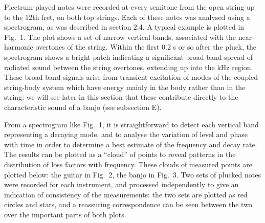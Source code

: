   Plectrum-played notes were recorded at every semitone from the open string up 
  to the 12th fret, on both top strings. Each of these notes was analysed using 
  a spectrogram, as was described in section 2.4. A typical example is plotted 
  in Fig.\ 1. The plot shows a set of narrow vertical bands, associated with 
  the near-harmonic overtones of the string. Within the first 0.2 s or so after 
  the pluck, the spectrogram shows a bright patch indicating a significant 
  broad-band spread of radiated sound between the string overtones, extending 
  up into the kHz region. These broad-band signals arise from transient 
  excitation of modes of the coupled string-body system which have energy 
  mainly in the body rather than in the string: we will see later in this 
  section that these contribute directly to the characteristic sound of a banjo 
  (see subsection E). 


  From a spectrogram like Fig.\ 1, it is straightforward to detect each 
  vertical band representing a decaying mode, and to analyse the variation of 
  level and phase with time in order to determine a best estimate of the 
  frequency and decay rate. The results can be plotted as a ``cloud'' of points 
  to reveal patterns in the distribution of loss factors with frequency. These 
  clouds of measured points are plotted below: the guitar in Fig.\ 2, the banjo 
  in Fig.\ 3. Two sets of plucked notes were recorded for each instrument, and 
  processed independently to give an indication of consistency of the 
  measurements: the two sets are plotted as red circles and stars, and a 
  reassuring correspondence can be seen between the two over the important 
  parts of both plots. 



